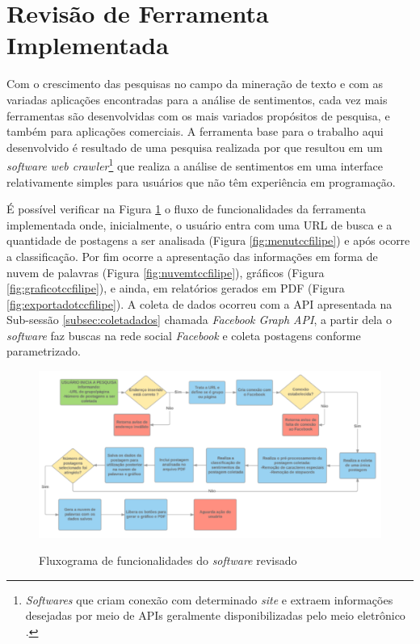 \section{Revisão de Ferramenta Implementada}
\label{sec:revisaoferramenta}
Com o crescimento das pesquisas no campo da mineração de texto e com as variadas aplicações encontradas para a análise de sentimentos, cada vez mais ferramentas são desenvolvidas com os mais variados propósitos de pesquisa, e também para aplicações comerciais. A ferramenta base para o trabalho aqui desenvolvido é resultado de uma pesquisa realizada por  que resultou em um \textit{software} \textit{web crawler}\footnote{ \textit{Softwares} que criam conexão com determinado \textit{site} e extraem informações desejadas por meio de APIs geralmente disponibilizadas pelo meio eletrônico \cite{Kumar2018}.} que realiza a análise de sentimentos em uma interface relativamente simples para usuários que não têm experiência em programação.

É possível verificar na Figura \ref{fig:fluxotccfilipe} o fluxo de funcionalidades da ferramenta implementada onde, inicialmente, o usuário entra com uma URL de busca e a quantidade de postagens a ser analisada (Figura \ref{fig:menutccfilipe}) e após ocorre a classificação. Por fim ocorre a apresentação das informações em forma de nuvem de palavras (Figura \ref{fig:nuvemtccfilipe}), gráficos (Figura \ref{fig:graficotccfilipe}), e ainda, em relatórios gerados em PDF (Figura \ref{fig:exportadotccfilipe}). A coleta de dados ocorreu com a API apresentada na Sub-sessão \ref{subsec:coletadados} chamada \textit{Facebook Graph API}, a partir dela o \textit{software} faz buscas na rede social \textit{Facebook} e coleta postagens conforme parametrizado.

\newpage

\begin{figure}[!h]
\centering 
\caption{Fluxograma de funcionalidades do \textit{software} revisado}
\includegraphics[scale=0.40]{imagens/fluxofilipe.png}
\label{fig:fluxotccfilipe}
\end{figure}

